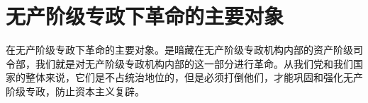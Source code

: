 \section[无产阶级专政下革命的主要对象（一九六七年八月）]{无产阶级专政下革命的主要对象}


在无产阶级专政下革命的主要对象。是暗藏在无产阶级专政机构内部的资产阶级司令部，我们就是对无产阶级专政机构内部的这一部分进行革命。从我们党和我们国家的整体来说，它们是不占统治地位的，但是必须打倒他们，才能巩固和强化无产阶级专政，防止资本主义复辟。



